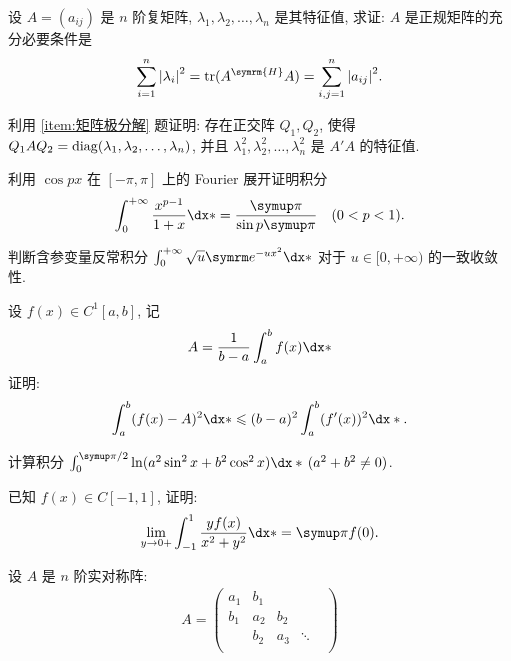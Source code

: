   \begin{exercise}[resume=exer]
      \sitem 设 $ A = (a_{ij}) $ 是 $ n $ 阶复矩阵, $ \lambda_{1}, \lambda_{2}, \dots, \lambda_{n} $ 是其特征值, 求证: $ A $ 是正规矩阵的充分必要条件是
      \begin{align*}
          \sum_{i=1}^{n}\abs{\lambda_{i}}^{2} = \tr(A^{\symrm{H}}A) = \sum_{i, j=1}^{n}\abs{a_{ij}}^{2}.
      \end{align*}
      \item 利用 \ref{item:矩阵极分解} 题证明: 存在正交阵 $ Q_{1}, Q_{2} $, 使得 $ Q_{1} A Q_{2} = \operatorname{diag}(\lambda_{1}, \lambda_{2}, \dots, \lambda_{n}) $, 并且 $ \lambda_{1}^{2}, \lambda_{2}^{2}, \dots, \lambda_{n}^{2} $ 是 $ A'A $ 的特征值.
      \item 利用 $ \cos px $ 在 $ [-\pi, \pi] $ 上的 Fourier 展开证明积分
      \begin{align*}
          \int_{0}^{+\infty} \frac{x^{p-1}}{1+x} \dx* = \frac{\pi}{\sin p\pi}\quad (0<p<1).
      \end{align*}
      \item 判断含参变量反常积分 $ \int_{0}^{+\infty}\sqrt{u}\me^{-ux^{2}} \dx* $ 对于 $ u \in [0, +\infty) $ 的一致收敛性.
      \item 设 $ f(x)\in C^{1}[a, b] $, 记
      \begin{align*}
          A = \frac{1}{b - a}\int_{a}^{b} f(x) \dx*
      \end{align*}
      证明:
      \begin{align*}
          \int_{a}^{b}(f(x) - A)^{2} \dx* \le (b-a)^{2} \int_{a}^{b} (f'(x))^{2} \dx*.
      \end{align*}
      \item 计算积分 $ \int_{0}^{\pi/2} \ln(a^{2}\sin^{2}x + b^{2}\cos^{2} x)\dx*\,(a^{2} + b^{2} \ne 0) $.
      \item 已知 $ f(x) \in C[-1, 1] $, 证明:
      \begin{align*}
          \limit{y}{0+} \int_{-1}^{1}\frac{yf(x)}{x^{2} + y^{2}} \dx* = \pi f(0).
      \end{align*}
      \item 设 $ A $ 是 $ n $ 阶实对称阵:
      \begin{align*}
          A = \begin{pmatrix}
              a_{1} & b_{1} & & & \\
              b_{1} & a_{2} & b_{2} & & \\
              & b_{2} & a_{3} & \ddots & \\

\end{pmatrix}
\end{align*}
\end{exercise}
